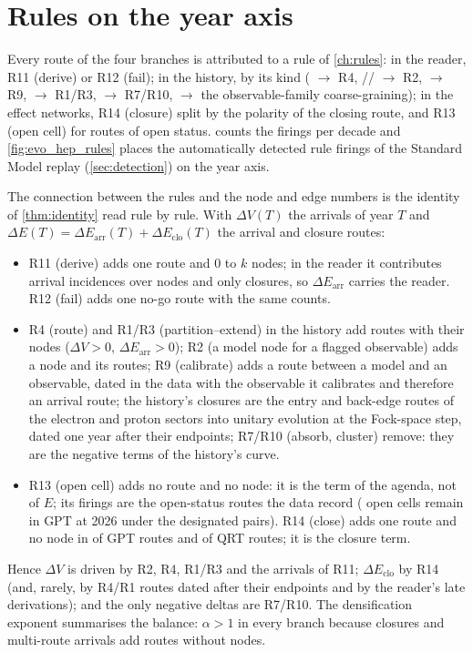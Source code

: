 \section{Rules on the year axis}\label{sec:rules-time}
Every route of the four branches is attributed to a rule of \cref{ch:rules}: in the reader, R11 (derive) or R12 (fail); in the history, by its kind ( $\to$ R4, // $\to$ R2,  $\to$ R9,  $\to$ R1/R3,  $\to$ R7/R10,  $\to$ the observable-family coarse-graining); in the effect networks, R14 (closure) split by the polarity of the closing route, and R13 (open cell) for routes of open status.  counts the firings per decade and \cref{fig:evo_hep_rules} places the automatically detected rule firings of the Standard Model replay (\cref{sec:detection}) on the year axis.

The connection between the rules and the node and edge numbers is the identity of \cref{thm:identity} read rule by rule. With $\Delta V(T)$ the arrivals of year $T$ and $\Delta E(T)=\Delta E_{\mathrm{arr}}(T)+\Delta E_{\mathrm{clo}}(T)$ the arrival and closure routes:
\begin{itemize}[nosep]
\item R11 (derive) adds one route and $0$ to $k$ nodes; in the reader it contributes \EEMSumArrDeg{} arrival incidences over \EEMVfin{} nodes and only \EEMClosures{} closures, so $\Delta E_{\mathrm{arr}}$ carries the reader. R12 (fail) adds one no-go route with the same counts.
\item R4 (route) and R1/R3 (partition--extend) in the history add routes with their nodes ($\Delta V>0$, $\Delta E_{\mathrm{arr}}>0$); R2 (a model node for a flagged observable) adds a node and its routes; R9 (calibrate) adds a route between a model and an observable, dated in the data with the observable it calibrates and therefore an arrival route; the history's \EHEPClosures{} closures are the entry and back-edge routes of the electron and proton sectors into unitary evolution at the Fock-space step, dated one year after their endpoints; R7/R10 (absorb, cluster) remove: they are the negative terms of the history's curve.
\item R13 (open cell) adds no route and no node: it is the term of the agenda, not of $E$; its firings are the open-status routes the data record (\EgptCensusOpenFinal{} open cells remain in GPT at 2026 under the designated pairs). R14 (close) adds one route and no node in \EGPTClosures{} of \EGPTEfin{} GPT routes and \EQRTClosures{} of \EQRTEfin{} QRT routes; it is the closure term.
\end{itemize}
Hence $\Delta V$ is driven by R2, R4, R1/R3 and the arrivals of R11; $\Delta E_{\mathrm{clo}}$ by R14 (and, rarely, by R4/R1 routes dated after their endpoints and by the reader's late derivations); and the only negative deltas are R7/R10. The densification exponent summarises the balance: $\alpha>1$ in every branch because closures and multi-route arrivals add routes without nodes.


